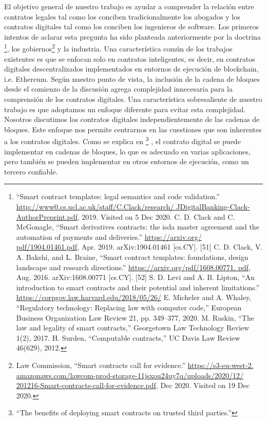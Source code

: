 \documentclass[12pt]{report} %
\begin{document}
El objetivo general de nuestro trabajo es ayudar a comprender la relación entre contratos legales tal como los conciben tradicionalmente los abogados y los contratos digitales tal como los conciben los ingenieros de software. Los primeros intentos de aclarar esta pregunta ha sido planteada anteriormente por la doctrina \footnote{\cite{Christopher2019}“Smart contract templates: legal semantics and code validation.” \url{http://www0.cs.ucl.ac.uk/staff/C.Clack/research/ JDigitalBanking-Clack-AuthorPreprint.pdf}, 2019. Visited on 5 Dec 2020. C. D. Clack and C. McGonagle, “Smart derivatives contracts: the isda master agreement and the automation of payments and deliveries.” \url{https://arxiv.org/ pdf/1904.01461.pdf}, Apr. 2019. arXiv:1904.01461 [cs.CY]. [51] C. D. Clack, V. A. Bakshi, and L. Braine, “Smart contract templates: foundations, design landscape and research directions.” \url{https://arxiv.org/pdf/1608.00771. pdf}, Aug. 2016. arXiv:1608.00771 [cs.CY]. [52] S. D. Levi and A. B. Lipton, “An introduction to smart contracts and their potential and inherent limitations.” \url{https://corpgov.law.harvard.edu/2018/05/26/} E. Micheler and A. Whaley, “Regulatory technology: Replacing law with computer code,” European Business Organization Law Review 21, pp. 349–377, 2020. M. Raskin, “The law and legality of smart contracts,” Georgetown Law Technology Review 1(2), 2017. H. Surden, “Computable contracts,” UC Davis Law Review 46(629), 2012. }, los gobiernos\footnote{\cite{LawCommission2020}Law Commission, “Smart contracts call for evidence.” \url{https://s3-eu-west-2. amazonaws.com/lawcom-prod-storage-11jsxou24uy7q/uploads/2020/12/ 201216-Smart-contracts-call-for-evidence.pdf}, Dec 2020. Visited on 19 Dec 2020.}  y la industria. Una característica común de los trabajos existentes es que se enfocan solo en contratos inteligentes, es decir, en contratos digitales descentralizados implementados en entornos de ejecución de blockchain, i.e. Ethereum. Según nuestro punto de vista, la inclusión de la cadena de bloques desde el comienzo de la discusión agrega complejidad innecesaria para la comprensión de los contratos digitales. Una característica sobresaliente de nuestro trabajo es que adoptamos un enfoque diferente para evitar esta complejidad. Nosotros discutimos los contratos digitales independientemente de las cadenas de bloques. Este enfoque nos permite centrarnos en las cuestiones que son inherentes a los contratos digitales. Como se explica en \footnote{\cite{CarlosMolinaJan2019}“The benefits of deploying smart contracts on trusted third parties.” } , el  contrato digital se puede implementar en cadenas de bloques, lo que es adecuado en varias aplicaciones, pero también se pueden implementar en otros entornos de ejecución, como un tercero confiable. 
\end{document}
